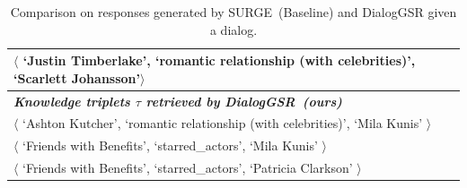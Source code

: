 \begin{table}[ht!]
{\begin{tabular}{llll}
        \multicolumn{4}{l}{$\langle$ `Justin Timberlake', `romantic relationship (with celebrities)', `Scarlett Johansson'$ \rangle$} \\
        \midrule
        \multicolumn{4}{l}{\textit{\textbf{Knowledge triplets $\tau$ retrieved by DialogGSR~(ours)}}}\\
        \multicolumn{4}{l}{$\langle$ `Ashton Kutcher', `romantic relationship (with celebrities)', `Mila Kunis' $\rangle$}\\
        \multicolumn{4}{l}{$\langle$ `Friends with Benefits', `starred\_actors', `Mila Kunis'  $\rangle$}\\
        \multicolumn{4}{l}{$\langle$ `Friends with Benefits', `starred\_actors', `Patricia Clarkson' $\rangle$}\\
\bottomrule
\end{tabular}
}
\caption{Comparison on responses generated by SURGE~(Baseline) and DialogGSR given a dialog.}
\label{tab:qual}
\end{table}